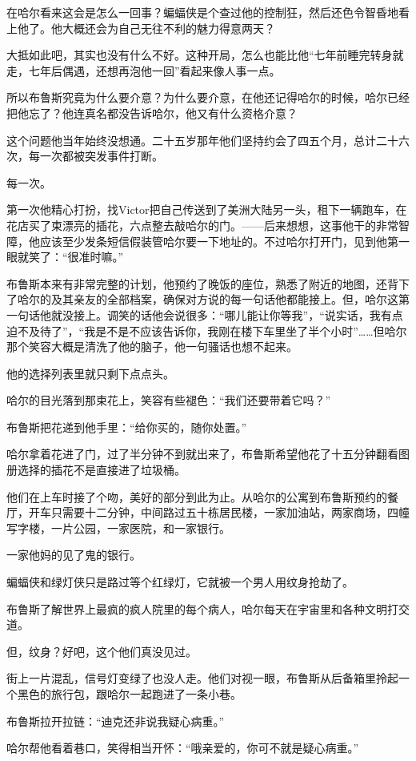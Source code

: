 \documentclass[../main]{subfiles}
\begin{document}
在哈尔看来这会是怎么一回事？蝙蝠侠是个查过他的控制狂，然后还色令智昏地看上他了。他大概还会为自己无往不利的魅力得意两天？

大抵如此吧，其实也没有什么不好。这种开局，怎么也能比他“七年前睡完转身就走，七年后偶遇，还想再泡他一回”看起来像人事一点。

所以布鲁斯究竟为什么要介意？为什么要介意，在他还记得哈尔的时候，哈尔已经把他忘了？他连真名都没告诉哈尔，他又有什么资格介意？

这个问题他当年始终没想通。二十五岁那年他们坚持约会了四五个月，总计二十六次，每一次都被突发事件打断。

每一次。

第一次他精心打扮，找Victor把自己传送到了美洲大陆另一头，租下一辆跑车，在花店买了束漂亮的插花，六点整去敲哈尔的门。——后来想想，这事他干的非常智障，他应该至少发条短信假装管哈尔要一下地址的。不过哈尔打开门，见到他第一眼就笑了：“很准时嘛。”

布鲁斯本来有非常完整的计划，他预约了晚饭的座位，熟悉了附近的地图，还背下了哈尔的及其亲友的全部档案，确保对方说的每一句话他都能接上。但，哈尔这第一句话他就没接上。调笑的话他会说很多：“哪儿能让你等我”，“说实话，我有点迫不及待了”，“我是不是不应该告诉你，我刚在楼下车里坐了半个小时”……但哈尔那个笑容大概是清洗了他的脑子，他一句骚话也想不起来。

他的选择列表里就只剩下点点头。

哈尔的目光落到那束花上，笑容有些褪色：“我们还要带着它吗？”

布鲁斯把花递到他手里：“给你买的，随你处置。”

哈尔拿着花进了门，过了半分钟不到就出来了，布鲁斯希望他花了十五分钟翻看图册选择的插花不是直接进了垃圾桶。

他们在上车时接了个吻，美好的部分到此为止。从哈尔的公寓到布鲁斯预约的餐厅，开车只需要十二分钟，中间路过五十栋居民楼，一家加油站，两家商场，四幢写字楼，一片公园，一家医院，和一家银行。

一家他妈的见了鬼的银行。

蝙蝠侠和绿灯侠只是路过等个红绿灯，它就被一个男人用纹身抢劫了。

布鲁斯了解世界上最疯的疯人院里的每个病人，哈尔每天在宇宙里和各种文明打交道。

但，纹身？好吧，这个他们真没见过。

街上一片混乱，信号灯变绿了也没人走。他们对视一眼，布鲁斯从后备箱里拎起一个黑色的旅行包，跟哈尔一起跑进了一条小巷。

布鲁斯拉开拉链：“迪克还非说我疑心病重。”

哈尔帮他看着巷口，笑得相当开怀：“哦亲爱的，你可不就是疑心病重。”
\end{document}
